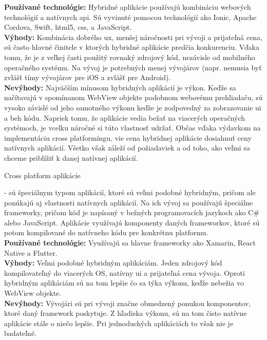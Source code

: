 \begin{itemize}[leftmargin=*]
{\bf Používané technológie:} Hybridné aplikácie používajú kombináciu webových technológií a natívnych \acrshort{api}. Sú vyvinuté pomocou technológií ako Ionic, Apache Cordova, Swift, \acrshort{html}5, \acrshort{css}, a JavaScript.  \\

{\bf Výhody:} Kombinácia dobrého \acrshort{ux}, menšej náročnosti pri vývoji a prijateľná cena, sú často hlavné činitele v ktorých hybridné aplikácie predčia konkurenciu. Vďaka tomu, že je z veľkej časti použitý rovnaký zdrojový kód, nezávisle od mobilného operačného systému. Na vývoj je potrebných menej vývojárov (napr. nemusia byť zvlášť tímy vývojárov pre iOS a zvlášť pre Android).  \\
 
{\bf Nevýhody: }  Najväčším mínusom hybridných aplikácií je výkon. Keďže sa načítavajú v spomínanom WebView objekte podobnom webovému prehliadaču, sú vysoko závislé od jeho samotného výkonu keďže je zodpovedný za zobrazovanie \acrshort{ui} a beh kódu. Napriek tomu, že aplikácie vedia bežať na viacerých operačných systémoch, je vcelku náročné si túto vlastnosť udržať. Občas vďaka výdavkom na implementáciu cross platformingu, vie cena hybridnej aplikácie dosiahnuť ceny natívnych aplikácií. Všetko však záleží od požiadaviek a od toho, ako veľmi sa chceme priblížiť k danej natívnej aplikácií.\\


{\bf \item Cross platform aplikácie} - sú špeciálnym typom aplikácií, ktoré sú veľmi podobné hybridným, pričom ale ponúkajú aj vlastnosti natívnych aplikácií. Na ich vývoj sa používajú špeciálne frameworky, pričom kód je napísaný v bežných programovacích jazykoch ako C\# alebo JavaScript. Aplikácie využívajú komponenty daných frameworkov, ktoré sú potom kompilované do natívneho kódu pre konkrétnu platformu. \\


{\bf Používané technológie:} Využívajú sa hlavne frameworky ako Xamarin, React Native a Flutter.  \\

{\bf Výhody:} Veľmi podobné hybridným aplikáciám. Jeden zdrojový kód kompilovateľný do viacerých OS, natívny \acrshort{ui} a prijateľná cena vývoja. Oproti hybridným aplikáciám sú na tom lepšie čo sa týka výkonu, keďže nebežia vo WebView objekte.  \\
 
{\bf Nevýhody:} Vývojári sú pri vývoji značne obmedzený ponukou komponentov, ktoré daný framework poskytuje. Z hľadiska výkonu, sú na tom čisto natívne aplikácie stále o niečo lepšie. Pri jednoduchých aplikáciách to však nie je badateľné.  \\
\end{itemize}

